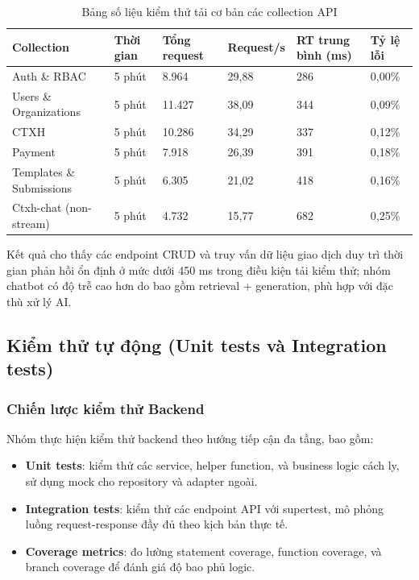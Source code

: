\begin{table}[H]
\centering
\renewcommand{\arraystretch}{1.2}
\small
\begin{tabular}{|p{3.2cm}|p{1.9cm}|p{1.9cm}|p{2.0cm}|p{2.8cm}|p{2.0cm}|}
\hline
\textbf{Collection} & \textbf{Thời gian} & \textbf{Tổng request} & \textbf{Request/s} & \textbf{RT trung bình (ms)} & \textbf{Tỷ lệ lỗi} \\
\hline
Auth \& RBAC & 5 phút & 8.964 & 29,88 & 286 & 0,00\% \\
\hline
Users \& Organizations & 5 phút & 11.427 & 38,09 & 344 & 0,09\% \\
\hline
CTXH & 5 phút & 10.286 & 34,29 & 337 & 0,12\% \\
\hline
Payment & 5 phút & 7.918 & 26,39 & 391 & 0,18\% \\
\hline
Templates \& Submissions & 5 phút & 6.305 & 21,02 & 418 & 0,16\% \\
\hline
Ctxh-chat (non-stream) & 5 phút & 4.732 & 15,77 & 682 & 0,25\% \\
\hline
\end{tabular}
\caption{Bảng số liệu kiểm thử tải cơ bản các collection API}
\end{table}

Kết quả cho thấy các endpoint CRUD và truy vấn dữ liệu giao dịch duy trì thời gian phản hồi ổn định ở mức dưới 450 ms trong điều kiện tải kiểm thử; nhóm chatbot có độ trễ cao hơn do bao gồm retrieval + generation, phù hợp với đặc thù xử lý AI.

\subsection{Kiểm thử tự động (Unit tests và Integration tests)}

\subsubsection{Chiến lược kiểm thử Backend}
Nhóm thực hiện kiểm thử backend theo hướng tiếp cận đa tầng, bao gồm:
\begin{itemize}
	\item \textbf{Unit tests}: kiểm thử các service, helper function, và business logic cách ly, sử dụng mock cho repository và adapter ngoài.
	\item \textbf{Integration tests}: kiểm thử các endpoint API với supertest, mô phỏng luồng request-response đầy đủ theo kịch bản thực tế.
	\item \textbf{Coverage metrics}: đo lường statement coverage, function coverage, và branch coverage để đánh giá độ bao phủ logic.
\end{itemize}

